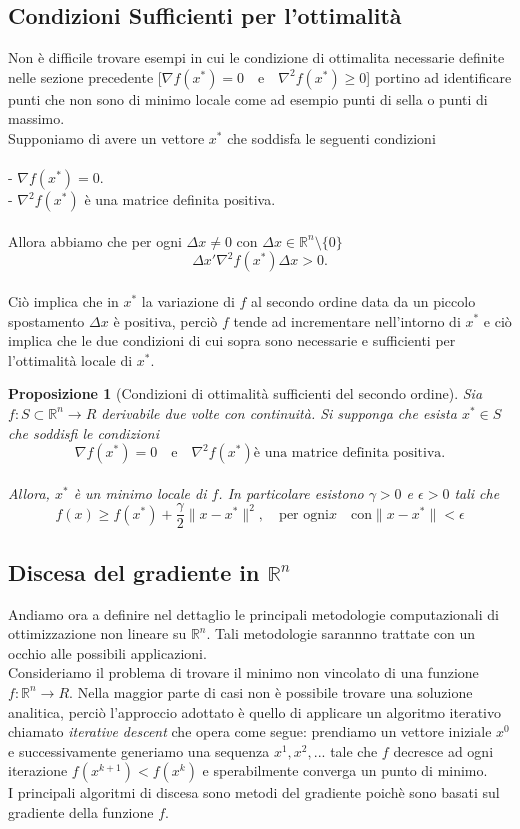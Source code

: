 \documentclass[a4paper, 12pt]{article}
\newtheorem{prop}{Proposizione}
\begin{document}
\subsection{Condizioni Sufficienti per l'ottimalità}
Non è difficile trovare esempi in cui le condizione di ottimalita necessarie definite nelle sezione precedente
[$\nabla f(x^\ast) = 0 \quad \mbox{e} \quad \nabla^2 f(x^\ast) \geq 0$]
portino ad identificare punti che non sono di minimo locale come ad esempio punti di sella o punti di massimo.\\
Supponiamo di avere un vettore $x^\ast$ che soddisfa le seguenti condizioni\\\\
- $\nabla f(x^\ast) = 0$.\\
- $\nabla^2 f(x^\ast)$ è una matrice definita positiva.\\\\
Allora abbiamo che per ogni $\Delta x \neq 0$ con $\Delta x \in \mathbb{R}^n \setminus \{0\}$\\
\[\Delta x' \nabla^2f(x^\ast) \Delta x > 0.\]\\
Ciò implica che in $x^\ast$ la variazione di $f$ al secondo ordine data da un piccolo spostamento $\Delta x$ è positiva, perciò $f$ tende ad incrementare nell'intorno di $x^\ast$ e ciò implica che le due condizioni di cui sopra sono necessarie e sufficienti per l'ottimalità locale di $x^\ast$.
\begin{prop}[Condizioni di ottimalità sufficienti del secondo ordine] Sia $f:S \subset \mathbb{R}^n \to R$ derivabile due volte con continuità. Si supponga che esista $x^\ast \in S$ che soddisfi le condizioni\\
\[\nabla f(x^\ast) = 0 \quad \mbox{e} \quad \nabla^2 f(x^\ast) \mbox{è una matrice definita positiva.}\]\\
Allora, $x^\ast$ è un minimo locale di $f$. In particolare esistono $\gamma > 0$ e $\epsilon > 0$ tali che\\
\[ f(x) \geq f(x^\ast) + \frac{\gamma}{2} \parallel x - x^\ast \parallel^2, \quad \mbox{per ogni} x \quad \mbox{con} \parallel x - x^\ast \parallel < \epsilon  \]
\end{prop}
\subsection{Discesa del gradiente in $\mathbb{R}^n$}
Andiamo ora a definire nel dettaglio le principali metodologie computazionali di ottimizzazione non lineare su $\mathbb{R}^n$. Tali metodologie sarannno trattate con un occhio alle possibili applicazioni.\\
Consideriamo il problema di trovare il minimo non vincolato di una funzione $f:\mathbb{R}^n \to R$. Nella maggior parte di casi non è possibile trovare una soluzione analitica, perciò l'approccio adottato è quello di applicare un algoritmo iterativo chiamato \textit{iterative descent} che opera come segue: prendiamo un vettore iniziale $x^0$ e successivamente generiamo una sequenza $x^1, x^2, ...$ tale che $f$ decresce ad ogni iterazione $f(x^{k+1}) < f(x^k)$ e sperabilmente converga un punto di minimo.\\
I principali algoritmi di discesa sono metodi del gradiente poichè sono basati sul gradiente della funzione $f$.
\end{document}
